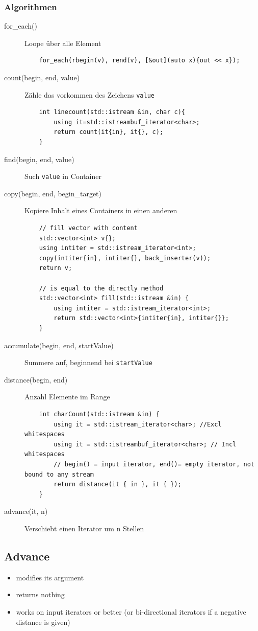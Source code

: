 \subsubsection{Algorithmen}
\begin{description}
	\item[for\_each()] Loope über alle Element
	\begin{lstlisting}
	for_each(rbegin(v), rend(v), [&out](auto x){out << x});
	\end{lstlisting}
	\item[count(begin, end, value)] Zähle das vorkommen des Zeichens \lstinline|value|
	\begin{lstlisting}
	int linecount(std::istream &in, char c){
		using it=std::istreambuf_iterator<char>;
		return count(it{in}, it{}, c);
	}
	\end{lstlisting}
	\item[find(begin, end, value)] Such \lstinline|value| in Container\newpage
	\item[copy(begin, end, begin\_target)] Kopiere Inhalt eines Containers in einen anderen
	\begin{lstlisting}
	// fill vector with content
	std::vector<int> v{};
	using intiter = std::istream_iterator<int>;
	copy(intiter{in}, intiter{}, back_inserter(v));
	return v;
	
	// is equal to the directly method
	std::vector<int> fill(std::istream &in) {
		using intiter = std::istream_iterator<int>;
		return std::vector<int>{intiter{in}, intiter{}};
	}
	\end{lstlisting}
	\item[accumulate(begin, end, startValue)] Summere auf, beginnend bei \lstinline|startValue|
	\item[distance(begin, end)] Anzahl Elemente im Range
	\begin{lstlisting}
	int charCount(std::istream &in) {
		using it = std::istream_iterator<char>; //Excl whitespaces
		using it = std::istreambuf_iterator<char>; // Incl whitespaces
		// begin() = input iterator, end()= empty iterator, not bound to any stream
		return distance(it { in }, it { });
	}
	\end{lstlisting}
	\item[advance(it, n)] Verschiebt einen Iterator um n Stellen
\end{description}


\subsection{Advance}
\begin{itemize}
	\item modifies its argument
	\item returns nothing
	\item works on input iterators or better (or bi-directional iterators if a negative distance is given)
\end{itemize}

